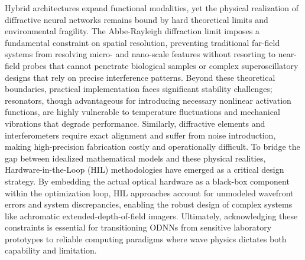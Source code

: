 \documentclass[11pt]{article}
\begin{document}
Hybrid architectures expand functional modalities, yet the physical realization of diffractive neural networks remains bound by hard theoretical limits and environmental fragility. The Abbe-Rayleigh diffraction limit imposes a fundamental constraint on spatial resolution, preventing traditional far-field systems from resolving micro- and nano-scale features without resorting to near-field probes that cannot penetrate biological samples or complex superoscillatory designs that rely on precise interference patterns. Beyond these theoretical boundaries, practical implementation faces significant stability challenges; resonators, though advantageous for introducing necessary nonlinear activation functions, are highly vulnerable to temperature fluctuations and mechanical vibrations that degrade performance. Similarly, diffractive elements and interferometers require exact alignment and suffer from noise introduction, making high-precision fabrication costly and operationally difficult. To bridge the gap between idealized mathematical models and these physical realities, Hardware-in-the-Loop (HIL) methodologies have emerged as a critical design strategy. By embedding the actual optical hardware as a black-box component within the optimization loop, HIL approaches account for unmodeled wavefront errors and system discrepancies, enabling the robust design of complex systems like achromatic extended-depth-of-field imagers. Ultimately, acknowledging these constraints is essential for transitioning ODNNs from sensitive laboratory prototypes to reliable computing paradigms where wave physics dictates both capability and limitation. \citep{doi_10_3390_nano14080697_c372a140} \citep{doi_10_1364_oe_461549_b2d41b3f} \citep{doi_10_1117_1_ap_6_5_056004_3f240d06}
\end{document}
